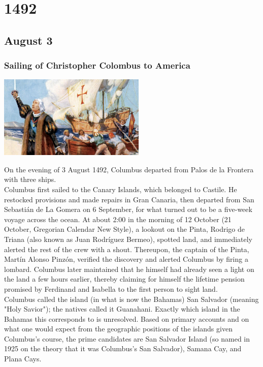\documentclass[11pt]{report}
\begin{document}
\chapter{1492}
\section{August 3}
\subsection{Sailing of Christopher Colombus to America}
\vspace{2mm}\begin{center}\includegraphics[width=7cm]{./img/colombus.jpg}\end{center}
On the evening of 3 August 1492, Columbus departed from Palos de la Frontera with three ships.\\ \indent Columbus first sailed to the Canary Islands, which belonged to Castile. He restocked provisions and made repairs in Gran Canaria, then departed from San Sebastián de La Gomera on 6 September, for what turned out to be a five-week voyage across the ocean. At about 2:00 in the morning of 12 October (21 October, Gregorian Calendar New Style), a lookout on the Pinta, Rodrigo de Triana (also known as Juan Rodríguez Bermeo), spotted land, and immediately alerted the rest of the crew with a shout. Thereupon, the captain of the Pinta, Martín Alonso Pinzón, verified the discovery and alerted Columbus by firing a lombard. Columbus later maintained that he himself had already seen a light on the land a few hours earlier, thereby claiming for himself the lifetime pension promised by Ferdinand and Isabella to the first person to sight land.\\
\indent Columbus called the island (in what is now the Bahamas) San Salvador (meaning "Holy Savior"); the natives called it Guanahani. Exactly which island in the Bahamas this corresponds to is unresolved. Based on primary accounts and on what one would expect from the geographic positions of the islands given Columbus's course, the prime candidates are San Salvador Island (so named in 1925 on the theory that it was Columbus's San Salvador), Samana Cay, and Plana Cays.
\end{document}
